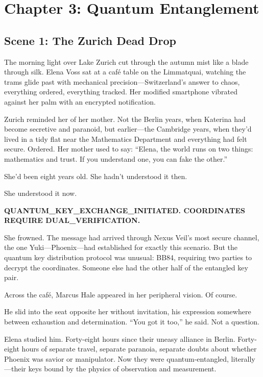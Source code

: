 \hypertarget{chapter-3-quantum-entanglement}{%
\section{Chapter 3: Quantum Entanglement}\label{chapter-3-quantum-entanglement}}

\hypertarget{scene-1-the-zurich-dead-drop}{%
\subsection{Scene 1: The Zurich Dead Drop}\label{scene-1-the-zurich-dead-drop}}

The morning light over Lake Zurich cut through the autumn mist like a blade through silk. Elena Voss sat at a café table on the Limmatquai, watching the trams glide past with mechanical precision---Switzerland's answer to chaos, everything ordered, everything tracked. Her modified smartphone vibrated against her palm with an encrypted notification.

Zurich reminded her of her mother. Not the Berlin years, when Katerina had become secretive and paranoid, but earlier---the Cambridge years, when they'd lived in a tidy flat near the Mathematics Department and everything had felt secure. Ordered. Her mother used to say: ``Elena, the world runs on two things: mathematics and trust. If you understand one, you can fake the other.''

She'd been eight years old. She hadn't understood it then.

She understood it now.

\textbf{QUANTUM\_KEY\_EXCHANGE\_INITIATED. COORDINATES REQUIRE DUAL\_VERIFICATION.}

She frowned. The message had arrived through Nexus Veil's most secure channel, the one Yuki---Phoenix---had established for exactly this scenario. But the quantum key distribution protocol was unusual: BB84, requiring two parties to decrypt the coordinates. Someone else had the other half of the entangled key pair.

Across the café, Marcus Hale appeared in her peripheral vision. Of course.

He slid into the seat opposite her without invitation, his expression somewhere between exhaustion and determination. ``You got it too,'' he said. Not a question.

Elena studied him. Forty-eight hours since their uneasy alliance in Berlin. Forty-eight hours of separate travel, separate paranoia, separate doubts about whether Phoenix was savior or manipulator. Now they were quantum-entangled, literally---their keys bound by the physics of observation and measurement.

